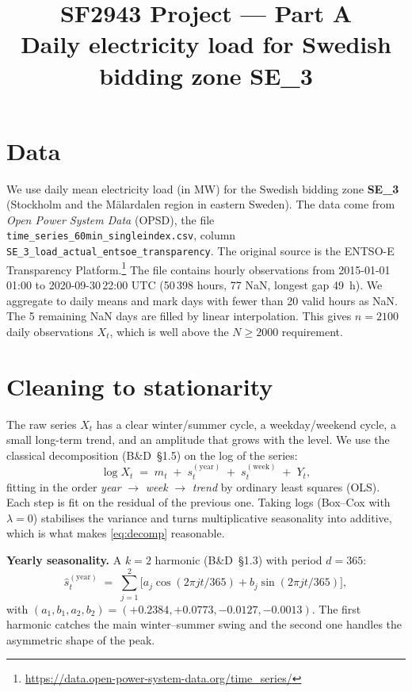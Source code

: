 \documentclass[11pt,a4paper]{article}
\title{\vspace{-2.5em}SF2943 Project --- Part A\\[1pt]
\large Daily electricity load for Swedish bidding zone SE\_3}
\author{}
\date{}
\begin{document}
\maketitle
\vspace{-3.6em}

\section{Data}
We use daily mean electricity load (in MW) for the Swedish bidding zone
\textbf{SE\_3} (Stockholm and the M\"alardalen region in eastern Sweden).
The data come from \emph{Open Power System Data} (OPSD), the file
\texttt{time\_series\_60min\_singleindex.csv}, column
\texttt{SE\_3\_load\_actual\_entsoe\_transparency}. The original source is the
ENTSO-E Transparency Platform.\footnote{\url{https://data.open-power-system-data.org/time_series/}}
The file contains hourly observations from 2015-01-01\,01:00 to
2020-09-30\,22:00 UTC (50\,398 hours, 77 NaN, longest gap 49~h). We aggregate
to daily means and mark days with fewer than 20 valid hours as NaN. The 5
remaining NaN days are filled by linear interpolation. This gives
$n = 2100$ daily observations $X_t$, which is well above the
$N \geq 2000$ requirement.

\section{Cleaning to stationarity}
The raw series $X_t$ has a clear winter/summer cycle, a weekday/weekend cycle,
a small long-term trend, and an amplitude that grows with the level. We use
the classical decomposition (B\&D~\S1.5) on the log of the series:
\begin{equation}
\log X_t \;=\; m_t \;+\; s_t^{(\mathrm{year})} \;+\; s_t^{(\mathrm{week})} \;+\; Y_t,
\label{eq:decomp}
\end{equation}
fitting in the order \emph{year} $\to$ \emph{week} $\to$ \emph{trend} by
ordinary least squares (OLS). Each step is fit on the residual of the previous
one. Taking logs (Box--Cox with $\lambda = 0$) stabilises the variance and
turns multiplicative seasonality into additive, which is what makes
\eqref{eq:decomp} reasonable.

\textbf{Yearly seasonality.} A $k=2$ harmonic (B\&D~\S1.3) with period $d=365$:
\[
\hat s_t^{(\mathrm{year})} \;=\; \sum_{j=1}^{2} \bigl[a_j \cos(2\pi j t / 365) + b_j \sin(2\pi j t / 365)\bigr],
\]
with $(a_1,b_1,a_2,b_2) = (+0.2384,+0.0773,-0.0127,-0.0013)$. The first
harmonic catches the main winter--summer swing and the second one handles the
asymmetric shape of the peak.
\end{document}

